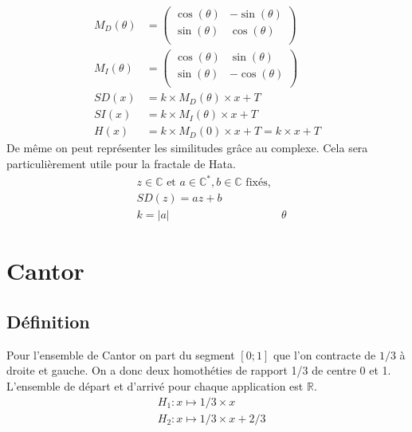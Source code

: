 \documentclass[a4paper, 12pt]{report}
\begin{document}
		\begin{align*}
			M_D(\theta)&=\left(	\begin{array}{ccc}
							\cos(\theta) &  -\sin(\theta) \\
							\sin(\theta) &  \cos(\theta)  \\
						\end{array} \right)\\
			M_I(\theta)&=\left(	\begin{array}{ccc}
							\cos(\theta) &  \sin(\theta) \\
							\sin(\theta) &  -\cos(\theta)  \\
						\end{array} \right)\\
			SD(x)&=k\times M_D(\theta)\times x + T\\
			SI(x)&=k\times M_I(\theta)\times x + T\\
			H(x)&=k\times M_D(0)\times x +T=k\times x+T
		\end{align*}
		\hspace{.7 cm} De même on peut représenter les similitudes grâce au complexe. Cela sera particulièrement utile pour la fractale de Hata.
		\begin{align*}
			&z\in\mathds{C} \textrm{ et } a\in\mathds{C}^*,b\in\mathds{C}\textrm{ fixés},\\
			&SD(z)=az+b\\
			&k=\lvert a\rvert
			&\theta
		\end{align*}


		\newpage
		\section{Cantor}
			\subsection{Définition}
				Pour l'ensemble de Cantor on part du segment $[0;1]$ que l'on contracte de $1/3$ à droite et gauche.
				On a donc deux homothéties de rapport 1/3 de centre 0 et 1. L'ensemble de départ et d'arrivé pour chaque application est $\mathds{R}.$ 
				\begin{align*}
					&H_1:x\mapsto 1/3\times x\\
					&H_2:x\mapsto 1/3\times x+2/3
				\end{align*}
\end{document}
